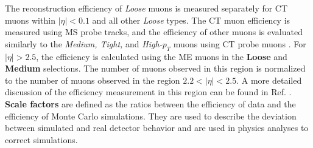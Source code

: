 The reconstruction efficiency of \textit{Loose} muons is measured separately for CT muons within $|\eta| < 0.1$ and all other \textit{Loose} types. The CT muon efficiency is measured using MS probe tracks, and the efficiency of other muons is evaluated similarly to the \textit{Medium, Tight,} and \textit{High-$p_T$} muons using CT probe muons \cite{MCPpaper}.
For $|\eta| > 2.5$, the efficiency is calculated using the ME muons in the \textbf{Loose} and \textbf{Medium} selections. The number of muons observed in this region is normalized to the number of muons observed in the region $2.2 < |\eta| < 2.5$. A more detailed discussion of the efficiency measurement in this region can be found in Ref. \cite{oldMCPpaper}. 
\textbf{Scale factors} are defined as the ratios between the efficiency of data and the efficiency of Monte Carlo simulations. They are used to describe the deviation between simulated and real detector behavior and are used in physics analyses to correct simulations. 

